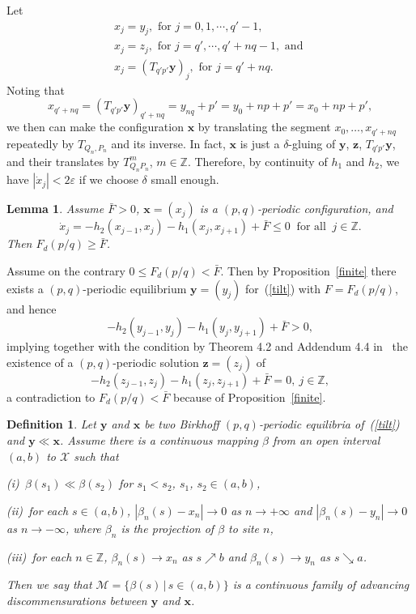 \documentclass[12pt]{article}
\newcommand{\Z}{\mathbb{Z}}
\newcommand{\eps}{\varepsilon}
\newcounter{number}
\newtheorem{lemma}{Lemma}
\newtheorem{definition}{Definition}
\newcommand{\begle}{\begin{lemma}\hspace{1em}}
\newcommand{\ele}{\end{lemma}
                       \addtocounter{number}{1}}
\newcommand{\begde}{\begin{definition}\hspace{1em}}
\newcommand{\ede}{\end{definition}
                           \addtocounter{number}{1}}
\newcommand{\emark}{\hfill\hspace{1em}\framebox[0.5em]{\rule{0cm}{0em}}
\vspace{2mm}}
\newcommand{\refer}[1]{~(\ref{#1})}
\newcommand{\zbf}{{\mathbf{z}}}
\newcommand{\xbf}{{\mathbf{x}}}
\newcommand{\ybf}{{\mathbf{y}}}
\newcommand{\pf}{{\bf Proof:}\hspace{1em}}
\begin{document}
Let
$$
\begin{array}{l}
x_j=y_j, \mbox{ for } j=0,1,\cdots,q'-1,\\[4pt]
 x_j=z_j,\mbox{ for }j=q',\cdots, q'+nq-1,\mbox{ and }\\[4pt]
x_j=(T_{q'p'}\ybf)_j, \mbox{ for }j=q'+nq.
\end{array}
$$
Noting that
$$
x_{q'+nq}=(T_{q'p'}\ybf)_{q'+nq}=y_{nq}+p'=y_0+np+p'=x_0+np+p',
$$
we then can make the configuration $\xbf$ by translating the segment $x_0,\ldots,x_{q'+nq}$ repeatedly by $T_{Q_n,P_n}$ and its inverse. In fact, $\xbf$ is just a $\delta$-gluing of  $\ybf$, $\zbf$, $T_{q'p'}\ybf$, and their translates by $T_{Q_nP_n}^m$, $m\in\Z$. Therefore, by continuity of $h_1$ and $h_2$, we have $|\dot{x}_j|<2\eps$ if we choose $\delta$ small enough.\emark

\begle\label{Fd}
Assume $\bar{F}>0$, $\xbf=(x_j)$ is a $(p,q)$-periodic configuration, and
$$
\dot{x}_j=-h_2(x_{j-1},x_j)-h_1(x_j,x_{j+1})+\bar{F}\leq 0\ \mbox{ for all }\ j\in\Z.
$$
Then $F_d(p/q)\geq \bar{F}$.
\ele
\noindent\pf
Assume on the contrary $0\leq F_d(p/q)<\bar{F}$. Then by Proposition~\ref{finite} there exists a $(p,q)$-periodic equilibrium $\ybf=(y_j)$ for\refer{tilt} with $F=F_d(p/q)$, and hence
$$
-h_2(y_{j-1},y_j)-h_1(y_j,y_{j+1})+\bar{F}> 0,
$$
implying together with the condition by Theorem 4.2 and Addendum 4.4 in~\cite{An} the existence of a $(p,q)$-periodic solution $\zbf=(z_j)$ of
$$
-h_2(z_{j-1},z_j)-h_1(z_j,z_{j+1})+\bar{F}= 0,\ j\in\Z,
$$
a contradiction to $F_d(p/q)<\bar{F}$ because of Proposition~\ref{finite}.\emark

\begde\label{family}
Let $\ybf$ and $\xbf$ be two Birkhoff $(p,q)$-periodic equilibria of\refer{tilt} and $\ybf\ll\xbf$. Assume there is a continuous mapping $\beta$ from an open interval $(a,b)$ to $\mathcal{X}$ such that

(i)\ $\beta(s_1)\ll\beta(s_2)$ for $s_1<s_2$, $s_1$, $s_2\in (a,b)$,

(ii)\ for each $s\in (a,b)$, $|\beta_n(s)-x_n|\to 0$ as $n\to +\infty$ and $|\beta_n(s)-y_n|\to 0$ as $n\to -\infty$, where $\beta_n$ is the projection of $\beta$ to site $n$,

(iii)\ for each $n\in\Z$, $\beta_n(s)\to x_n$ as $s\nearrow b$ and
$\beta_n(s)\to y_n$ as $s\searrow a$.

Then we say that $\mathcal{M}=\{\beta(s)\,|\,s\in (a,b)\}$ is a continuous family of advancing discommensurations between $\ybf$ and $\xbf$.
\ede
\end{document}
